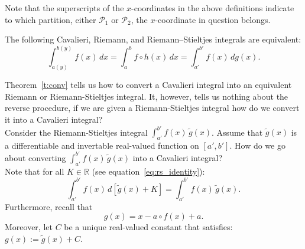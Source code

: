 \documentclass[twoside,reqno,11pt]{fcaa-var} %
\begin{document}
\noindent
Note that the superscripts of the $x$-coordinates in the above definitions indicate to which partition, either $\mathcal{P}_1$ or $\mathcal{P}_2$, the $x$-coordinate in question belongs.

\begin{theorem}
\label{t:conv}
The following Cavalieri, Riemann, and Riemann--Stieltjes integrals are equivalent:
\begin{equation}
\int_{a(y)}^{b(y)} f(x)\,dx = \int_a^b f\circ h(x)\,dx = \int_{a'}^{b'} f(x)\,dg(x).
\end{equation}
\end{theorem}

\noindent
Theorem~\ref{t:conv} tells us how to convert a Cavalieri integral into an equivalent Riemann or Riemann-Stieltjes integral. It, however, tells us nothing about the reverse procedure, if we are given a Riemann-Stieltjes integral how do we convert it into a Cavalieri integral?\\ 

\noindent
Consider the Riemann-Stieltjes integral $\int_{a'}^{b'} f(x)\,\widetilde{g}(x)$. Assume that $\widetilde{g}(x)$ is a differentiable and invertable real-valued function on $[a',b']$. How do we go about converting $\int_{a'}^{b'} f(x)\,\widetilde{g}(x)$ into a Cavalieri integral?\\ 

\noindent
Note that for all $K\in\mathbb{R}$ (see equation~\eqref{eq:rs_identity}):
\begin{equation}
\int_{a'}^{b'} f(x)\,d[\widetilde{g}(x)+K] = \int_{a'}^{b'}f(x)\,\widetilde{g}(x). 
\end{equation}
Furthermore, recall that
\begin{equation}
\label{eq:g_definition}
g(x) = x - a\circ f(x) + a.
\end{equation}
Moreover, let $C$ be a unique real-valued constant that satisfies: $g(x) := \widetilde{g}(x)+C$.\\
\end{document}
